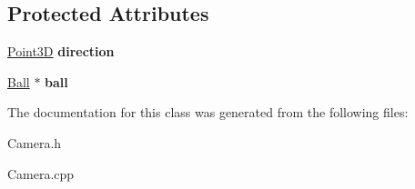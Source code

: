 \subsection*{Protected Attributes}
\begin{DoxyCompactItemize}
\item 
\hypertarget{class_camera_a6969c8a06de8be781e79039c560895aa}{\hyperlink{struct_point3_d}{Point3\+D} {\bfseries direction}}\label{class_camera_a6969c8a06de8be781e79039c560895aa}

\item 
\hypertarget{class_camera_ac949c9480f9e1935fcfe31b1b88f12bb}{\hyperlink{class_ball}{Ball} $\ast$ {\bfseries ball}}\label{class_camera_ac949c9480f9e1935fcfe31b1b88f12bb}

\end{DoxyCompactItemize}


The documentation for this class was generated from the following files\+:\begin{DoxyCompactItemize}
\item 
Camera.\+h\item 
Camera.\+cpp\end{DoxyCompactItemize}
